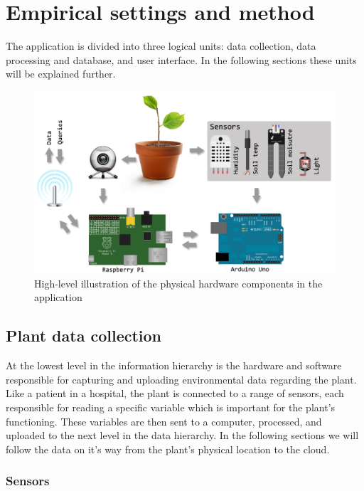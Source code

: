 \chapter{Empirical settings and method}
The application is divided into three logical units: data collection, data processing and database, and user interface. In the following sections these units will be explained further. 

\begin{figure}
\centering
\includegraphics[width=1\textwidth]{img/hardware/application.png}
\caption{High-level illustration of the physical hardware components in the application}
\label{fig:application}
\end{figure}

\section{Plant data collection}
At the lowest level in the information hierarchy is the hardware and software responsible for capturing and uploading environmental data regarding the plant. Like a patient in a hospital, the plant is connected to a range of sensors, each responsible for reading a specific variable which is important for the plant’s functioning. These variables are then sent to a computer, processed, and uploaded to the next level in the data hierarchy. In the following sections we will follow the data on it’s way from the plant’s physical location to the cloud.

\subsection{Sensors}

